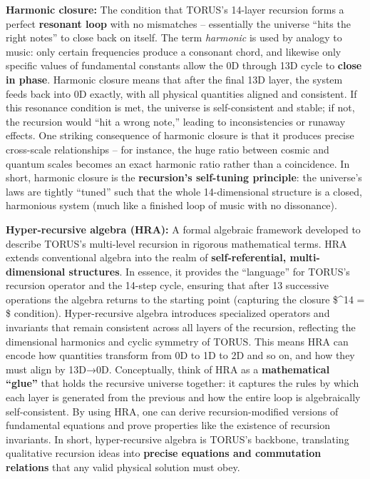 \documentclass[]{article}
\begin{document}
\textbf{Harmonic closure:} The condition that TORUS's 14-layer recursion
forms a perfect \textbf{resonant loop} with no mismatches -- essentially
the universe ``hits the right notes'' to close back on itself. The term
\emph{harmonic} is used by analogy to music: only certain frequencies
produce a consonant chord, and likewise only specific values of
fundamental constants allow the 0D through 13D cycle to \textbf{close in
phase}​. Harmonic closure means that after the final 13D layer, the
system feeds back into 0D exactly, with all physical quantities aligned
and consistent​. If this resonance condition is met, the universe is
self-consistent and stable; if not, the recursion would ``hit a wrong
note,'' leading to inconsistencies or runaway effects. One striking
consequence of harmonic closure is that it produces precise cross-scale
relationships -- for instance, the huge ratio between cosmic and quantum
scales becomes an exact harmonic ratio rather than a coincidence​. In
short, harmonic closure is the \textbf{recursion's self-tuning
principle}: the universe's laws are tightly ``tuned'' such that the
whole 14-dimensional structure is a closed, harmonious system (much like
a finished loop of music with no dissonance).

\textbf{Hyper-recursive algebra (HRA):} A formal algebraic framework
developed to describe TORUS's multi-level recursion in rigorous
mathematical terms. HRA extends conventional algebra into the realm of
\textbf{self-referential, multi-dimensional structures}​. In essence, it
provides the ``language'' for TORUS's recursion operator and the 14-step
cycle, ensuring that after 13 successive operations the algebra returns
to the starting point (capturing the closure
\$^{14} = \$
condition)​. Hyper-recursive algebra introduces specialized operators
and invariants that remain consistent across all layers of the
recursion, reflecting the dimensional harmonics and cyclic symmetry of
TORUS​. This means HRA can encode how quantities transform from 0D to 1D
to 2D and so on, and how they must align by 13D→0D. Conceptually, think
of HRA as a \textbf{mathematical ``glue''} that holds the recursive
universe together: it captures the rules by which each layer is
generated from the previous and how the entire loop is algebraically
self-consistent. By using HRA, one can derive recursion-modified
versions of fundamental equations and prove properties like the
existence of recursion invariants. In short, hyper-recursive algebra is
TORUS's backbone, translating qualitative recursion ideas into
\textbf{precise equations and commutation relations} that any valid
physical solution must obey.
\end{document}
